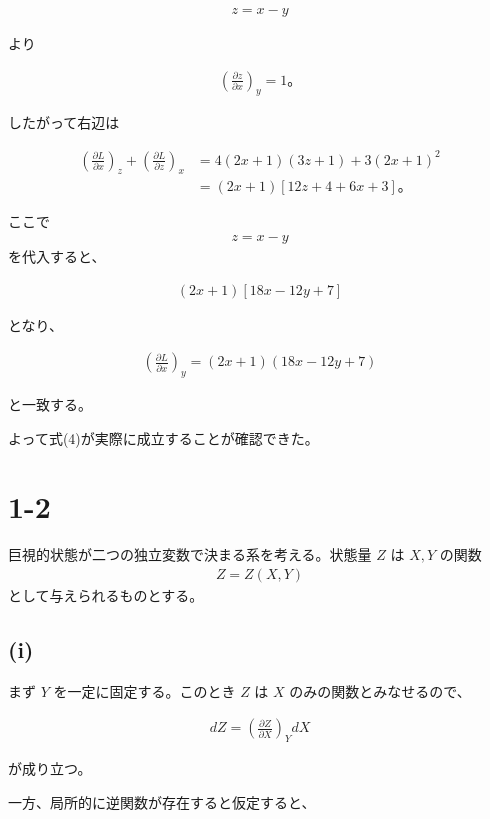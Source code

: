 \documentclass[platex,dvipdfmx,a4paper]{jsarticle}
\begin{document}
\begin{align*}
z=x-y
\end{align*}

より

\begin{align*}
\left(\frac{\partial z}{\partial x}\right)_y
=1。
\end{align*}

したがって右辺は

\begin{align*}
\left(\frac{\partial L}{\partial x}\right)_z
+
\left(\frac{\partial L}{\partial z}\right)_x
&=
4(2x+1)(3z+1)
+
3(2x+1)^2 \\
&=
(2x+1)\left[12z+4+6x+3\right]。
\end{align*}

ここで
\begin{align*}
z=x-y
\end{align*}
を代入すると、

\begin{align*}
(2x+1)
\left[
18x-12y+7
\right]
\end{align*}

となり、

\begin{align*}
\left(\frac{\partial L}{\partial x}\right)_y
=
(2x+1)(18x-12y+7)
\end{align*}

と一致する。

よって式(4)が実際に成立することが確認できた。
\section{1-2}

巨視的状態が二つの独立変数で決まる系を考える。状態量 $Z$ は $X,Y$ の関数
\begin{align*}
Z=Z(X,Y)
\end{align*}
として与えられるものとする。

\subsection{(i)}

まず $Y$ を一定に固定する。このとき $Z$ は $X$ のみの関数とみなせるので、

\begin{align*}
dZ
=
\left(\frac{\partial Z}{\partial X}\right)_Y dX
\end{align*}

が成り立つ。

一方、局所的に逆関数が存在すると仮定すると、
\end{document}
